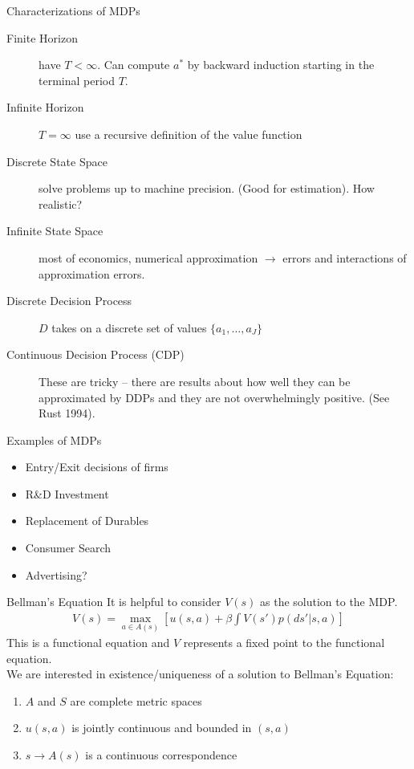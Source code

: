 \documentclass[xcolor=pdftex,dvipsnames,table,mathserif,aspectratio=169]{beamer}
\begin{document}
\begin{frame}{Characterizations of MDPs}
\begin{description}
\item[Finite Horizon] have $T < \infty$. Can compute $a^*$ by backward induction starting in the terminal period $T$.
\item[Infinite Horizon] $T=\infty$ use a recursive definition of the value function
\item[Discrete State Space] solve problems up to machine precision. (Good for estimation).  How realistic?
\item[Infinite State Space] most of economics, numerical approximation $\rightarrow$  errors and interactions of approximation errors.
\item [Discrete Decision Process] $D$ takes on a discrete set of values $\{a_1,\ldots,a_J\}$
\item[Continuous Decision Process (CDP)] These are tricky -- there are results about how well they can be approximated by DDPs and they are not overwhelmingly positive. (See Rust 1994).
\end{description}
\end{frame}

\begin{frame}{Examples of MDPs}
\begin{itemize}
\item Entry/Exit decisions of firms
\item R\&D Investment
\item Replacement of Durables
\item Consumer Search
\item Advertising?
\end{itemize}
\end{frame}

\begin{frame}{Bellman's Equation}
It is helpful to consider $V(s)$ as the solution to the MDP.  
\begin{eqnarray*}
V(s) = \max_{a \in A(s)} [ u(s,a) + \beta \int V(s') p(ds' | s,a)]
\end{eqnarray*}
This is a \alert{functional equation} and $V$ represents a \alert{fixed point} to the functional equation.\\
\vspace{0.5cm}
We are interested in existence/uniqueness of a solution to Bellman's Equation:
\begin{enumerate}
\item $A$ and $S$ are complete metric spaces
\item $u(s,a)$ is jointly continuous and bounded in $(s,a)$
\item $s \rightarrow A(s)$ is a continuous correspondence
\end{enumerate}
\end{frame}
\end{document}
